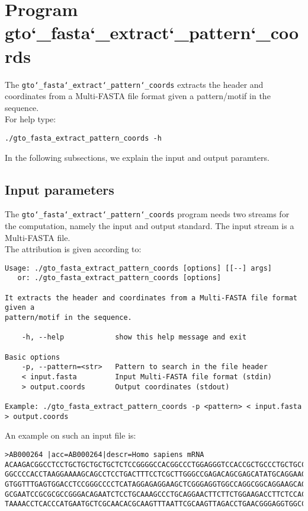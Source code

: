 \section{Program gto\char`_fasta\char`_extract\char`_pattern\char`_coords}
The \texttt{gto\char`_fasta\char`_extract\char`_pattern\char`_coords} extracts the header and coordinates from a Multi-FASTA file format given a pattern/motif in the sequence. \\
For help type:
\begin{lstlisting}
./gto_fasta_extract_pattern_coords -h
\end{lstlisting}
In the following subsections, we explain the input and output paramters.

\subsection*{Input parameters}

The \texttt{gto\char`_fasta\char`_extract\char`_pattern\char`_coords} program needs two streams for the computation, namely the input and output standard. The input stream is a Multi-FASTA  file.\\
The attribution is given according to:
\begin{lstlisting}
Usage: ./gto_fasta_extract_pattern_coords [options] [[--] args]
   or: ./gto_fasta_extract_pattern_coords [options]

It extracts the header and coordinates from a Multi-FASTA file format given a 
pattern/motif in the sequence.

    -h, --help            show this help message and exit

Basic options
    -p, --pattern=<str>   Pattern to search in the file header
    < input.fasta         Input Multi-FASTA file format (stdin)
    > output.coords       Output coordinates (stdout)

Example: ./gto_fasta_extract_pattern_coords -p <pattern> < input.fasta > output.coords
\end{lstlisting}
An example on such an input file is:
\begin{lstlisting}
>AB000264 |acc=AB000264|descr=Homo sapiens mRNA 
ACAAGACGGCCTCCTGCTGCTGCTGCTCTCCGGGGCCACGGCCCTGGAGGGTCCACCGCTGCCCTGCTGCCATTGTCCCC
GGCCCCACCTAAGGAAAAGCAGCCTCCTGACTTTCCTCGCTTGGGCCGAGACAGCGAGCATATGCAGGAAGCGGCAGGAA
GTGGTTTGAGTGGACCTCCGGGCCCCTCATAGGAGAGGAAGCTCGGGAGGTGGCCAGGCGGCAGGAAGCAGGCCAGTGCC
GCGAATCCGCGCGCCGGGACAGAATCTCCTGCAAAGCCCTGCAGGAACTTCTTCTGGAAGACCTTCTCCACCCCCCCAGC
TAAAACCTCACCCATGAATGCTCGCAACACGCAAGTTTAATTCGCAAGTTAGACCTGAACGGGAGGTGGCCACGCAAGTT
\end{lstlisting}

